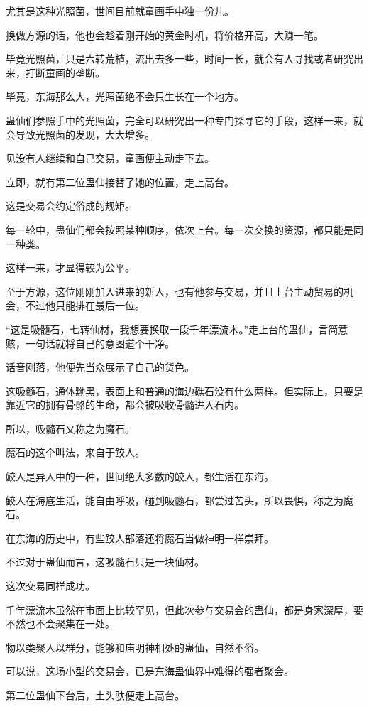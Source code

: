 \begin{this_body}
尤其是这种光照菌，世间目前就童画手中独一份儿。

换做方源的话，他也会趁着刚开始的黄金时机，将价格开高，大赚一笔。

毕竟光照菌，只是六转荒植，流出去多一些，时间一长，就会有人寻找或者研究出来，打断童画的垄断。

毕竟，东海那么大，光照菌绝不会只生长在一个地方。

蛊仙们参照手中的光照菌，完全可以研究出一种专门探寻它的手段，这样一来，就会导致光照菌的发现，大大增多。

见没有人继续和自己交易，童画便主动走下去。

立即，就有第二位蛊仙接替了她的位置，走上高台。

这是交易会约定俗成的规矩。

每一轮中，蛊仙们都会按照某种顺序，依次上台。每一次交换的资源，都只能是同一种类。

这样一来，才显得较为公平。

至于方源，这位刚刚加入进来的新人，也有他参与交易，并且上台主动贸易的机会，不过他只能排在最后一位。

“这是吸髓石，七转仙材，我想要换取一段千年漂流木。”走上台的蛊仙，言简意赅，一句话就将自己的意图道个干净。

话音刚落，他便先当众展示了自己的货色。

这吸髓石，通体黝黑，表面上和普通的海边礁石没有什么两样。但实际上，只要是靠近它的拥有骨骼的生命，都会被吸收骨髓进入石内。

所以，吸髓石又称之为魔石。

魔石的这个叫法，来自于鲛人。

鲛人是异人中的一种，世间绝大多数的鲛人，都生活在东海。

鲛人在海底生活，能自由呼吸，碰到吸髓石，都尝过苦头，所以畏惧，称之为魔石。

在东海的历史中，有些鲛人部落还将魔石当做神明一样崇拜。

不过对于蛊仙而言，这吸髓石只是一块仙材。

这次交易同样成功。

千年漂流木虽然在市面上比较罕见，但此次参与交易会的蛊仙，都是身家深厚，要不然也不会聚集在一处。

物以类聚人以群分，能够和庙明神相处的蛊仙，自然不俗。

可以说，这场小型的交易会，已是东海蛊仙界中难得的强者聚会。

第二位蛊仙下台后，土头驮便走上高台。


\end{this_body}
